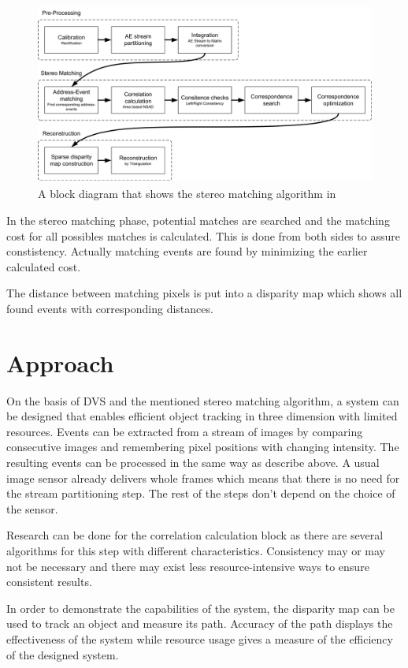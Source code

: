 \begin{figure}[h!t]
	\begin{center}
		\includegraphics[height=60mm]{Images/DVS_stereo.png}
	\end{center}
	\caption{A block diagram that shows the stereo matching algorithm in \citet{Belbachir01}}
	\label{fig:DVS_stereo}
\end{figure}

In the stereo matching phase, potential matches are searched and the matching cost for all possibles matches is calculated. This is done from both sides to assure constistency. Actually matching events are found by minimizing the earlier calculated cost. 

The distance between matching pixels is put into a disparity map which shows all found events with corresponding distances. 

\section{Approach}
On the basis of DVS and the mentioned stereo matching algorithm, a system can be designed that enables efficient object tracking in three dimension with limited resources. Events can be extracted from a stream of images by comparing consecutive images and remembering pixel positions with changing intensity. The resulting events can be processed in the same way as describe above. A usual image sensor already delivers whole frames which means that there is no need for the stream partitioning step. The rest of the steps don't depend on the choice of the sensor. 

Research can be done for the correlation calculation block as there are several algorithms for this step with different characteristics. Consistency may or may not be necessary and there may exist less resource-intensive ways to ensure consistent results. 

In order to demonstrate the capabilities of the system, the disparity map can be used to track an object and measure its path. Accuracy of the path displays the effectiveness of the system while resource usage gives a measure of the efficiency of the designed system. 